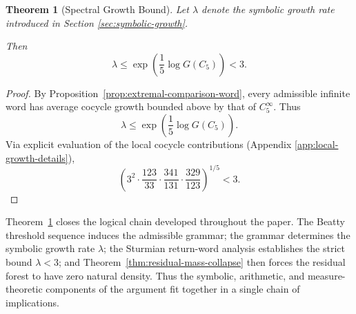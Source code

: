 \documentclass[12pt, oneside]{article}
\numberwithin{equation}{section}
\theoremstyle{definition}
\theoremstyle{plain}
\newtheorem{theorem}{Theorem}[section]
\theoremstyle{remark}
\begin{document}
\begin{theorem}[Spectral Growth Bound]
\label{thm:spectral-growth-bound}
Let $\lambda$ denote the symbolic growth rate introduced in Section
\ref{sec:symbolic-growth}.

Then
\[
\lambda \le \exp\!\left(\frac{1}{5}\log G(C_5)\right) < 3.
\]
\end{theorem}

\begin{proof}
By Proposition~\ref{prop:extremal-comparison-word}, every admissible infinite
word has average cocycle growth bounded above by that of \(C_5^\infty\).  Thus
\[
\lambda \le \exp\!\left(\frac{1}{5}\log G(C_5)\right).
\]
Via explicit evaluation of the local cocycle contributions (Appendix \ref{app:local-growth-details}),
\[
\left(
3^{2}
\cdot \frac{123}{33}
\cdot \frac{341}{131}
\cdot \frac{329}{123}
\right)^{1/5}
< 3.
\]
\end{proof}
Theorem~\ref{thm:spectral-growth-bound} closes the logical chain developed throughout
the paper. The Beatty threshold sequence induces the admissible grammar; the grammar
determines the symbolic growth rate \(\lambda\); the Sturmian return-word analysis
establishes the strict bound \(\lambda < 3\); and Theorem~\ref{thm:residual-mass-collapse}
then forces the residual forest to have zero natural density. Thus the symbolic, arithmetic,
and measure-theoretic components of the argument fit together in a single chain of implications.



\end{document}
